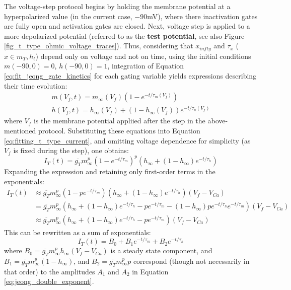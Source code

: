 \documentclass[../main.tex]{subfiles}
\begin{document}
The voltage-step protocol begins by holding the membrane potential at a hyperpolarized value (in the current case, $-90$mV), where there inactivation gates are fully open and activation gates are closed. Next, voltage step is applied to a more depolarized potential (referred to as the \textbf{test potential}, see also Figure \ref{fig_t_type_ohmic_voltage_traces}). Thus, considering that $x_{infty}$ and $\tau_x$ ($x\in {m_T, h_t}$) depend only on voltage and not on time, using the initial conditions $m(-90,0)=0$, $h(-90,0)=1$, integration of Equation \ref{eq:fit_jeong_gate_kinetics} for each gating variable yields expressions describing their time evolution:
\begin{align*}
    m(V_f,t) = m_\infty(V_f)(1 - e^{-t/\tau_m(V_f)}) \\
    h(V_f,t) = h_\infty(V_f) + (1 - h_\infty(V_f))e^{-t/\tau_h(V_f)}
\end{align*}
where $V_f$ is the membrane potential appliied after the step in the above-mentioned protocol. Substituting these equations into Equation \ref{eq:fitting_t_type_current}, and omitting voltage dependence for simplicity (as $V_f$ is fixed during the step), one obtains:
\begin{equation*}
    I_T(t) = \overline{g_T}m^p_\infty(1 - e^{-t/\tau_m})^p \left( h_\infty + (1 - h_\infty)e^{-t/\tau_h} \right)
\end{equation*}
Expanding the expression and retaining only first-order terms in the exponentials:
\begin{align*}
    I_T(t) &\approx \overline{g_T}m^p_\infty (1 - p e^{-t/\tau_m})\left( h_\infty + (1 - h_\infty)e^{-t/\tau_h} \right) (V_f-V_{Ca})\\
    &= \overline{g_T}m^p_\infty \left(
        h_\infty + (1 - h_\infty)e^{-t/\tau_h} - p e^{-t/\tau_m} - (1 - h_\infty)p e^{-t/\tau_h}e^{-t/\tau_m}
    \right) (V_f-V_{Ca}) \\
    &\approx \overline{g_T}m^p_\infty \left(
        h_\infty + (1 - h_\infty)e^{-t/\tau_h} - p e^{-t/\tau_m}
    \right) (V_f-V_{Ca})
\end{align*}
This can be rewritten as a sum of exponentials:
\begin{equation}\label{eq:jeong_double_exponential_from_integration}
    I_T(t) = B_0 + B_1 e^{-t/\tau_m} + B_2 e^{-t/\tau_h}
\end{equation}
where $B_0=\overline{g_T}m^p_\infty h_\infty (V_f-V_{Ca})$ is a steady state component, and $B_1=\overline{g_T}m^p_\infty (1-h_\infty)$, and $B_2=\overline{g_T}m^p_\infty p$ correspond (though not necessarily in that order) to the amplitudes $A_1$ and $A_2$ in Equation \ref{eq:jeong_double_exponent}.
\end{document}
